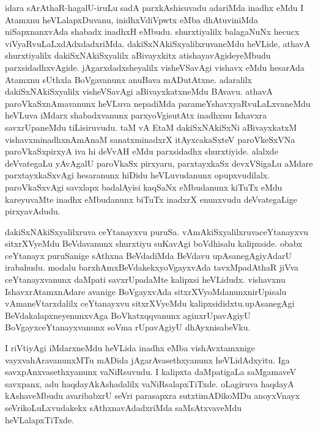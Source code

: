 \begin{artha}
idara sArAthaR-hagalU-iruLu sadA parxkAshisuvadu adariMda inadhx eMdu I Atamxnu heVLalapxDuvanu, inidhxVdiVpwtx eMba dhAtuviniMda niSapxnanxvAda shabadx inadhxH eMbudu. shurxtiyalilx balagaNuNx hecucx viVyaRvuLaLxdAdxdadxriMda. dakiSxNAkiSxyalilxruvaneMdu heVLide, athavA shurxtiyalilx dakiSxNAkiSxyalilx aBivayxkitx atishayavAgideyeMbudu parxsidadhxvAgide. jAgarxdadxsheyalilx visheVSavAgi vishavx eMdu hesarAda Atamxnu sUthxla BoVgavanunx anuBava mADutAtxne. adaralilx dakiSxNAkiSxyalilx visheVSavAgi aBivayxkatxneMdu BAvavu. athavA paroVkaSxnAmavanunx heVLuva nepadiMda parameYshavxyaRvuLaLxvaneMdu heVLuva iMdarx shabadxvanunx parxyoVgisutAtx inadhxnu Ishavxra savxrUpaneMdu tiLisiruvudu. taM vA EtaM dakiSxNAkiSxNi aBivayxkatxM vishavxminadhxnAmAnaM sanatxminadxrX itAyxcakaSxteV paroVkeSxVNa paroVkaSxpirxyA iva hi deVvAH eMdu parxsidadhx shurxtiyide. alalxde deVvategaLu yAvAgalU paroVkaSx pirxyaru, parxtayxkaSx devxVSigaLu aMdare parxtayxkaSxvAgi hesaranunx hiDidu heVLuvudanunx opupxvudilalx. paroVkaSxvAgi savxlapx badalAyisi kaqSaNx eMbudanunx kiTuTx eMdu kareyuvaMte inadhx eMbudanunx biTuTx inadxrX enunxvudu deVvategaLige pirxyavAdudu. 
\end{artha}


\begin{artha}
dakiSxNAkiSxyalilxruva ceYtanayxvu puruSa. vAmAkiSxyalilxruva\break ceYtanayxvu sitxrXVyeMdu BeVdavanunx shurxtiyu suKavAgi boVdhisalu kalipxside. obabx ceYtanayx puruSanige sAthxna BeVdadiMda BeVdavu upAsanegAgiyAdarU irabahudu. modalu barxhAmxBeVdakekxyoVgayxvAda tavxMpadAthaR jiVva ceYtanayxvanunx daMpati savxrUpadaMte kalipxsi heVLidudx. vishavxnu IshavxrAtamxnAdare avanige BoVgayxvAda sitxrXVyoMdanunx\break nirUpisalu vAmaneVtarxdalilx ceYtanayxvu sitxrXVyeMdu kalipxsididxtu.\break upAsanegAgi BeVdakalapxneyenunxvAga BoVkatxqqvanunx aginxrUpa\-\break vAgiyU BoVgayxceYtanayxvanunx soVma rUpavAgiyU dhAyxnisabeVku.
\end{artha}

\begin{artha}
I riVtiyAgi iMdarxneMdu heVLida inadhx eMba vishAvxtamxnige vayxvahAravanunxMTu mADida jAgarAvasethxyanunx heVLidAdxyitu. Iga savxpAnxvasethxyanunx vaNiRsuvudu. I kalipxta daMpatigaLa saMgamaveV savxpanx, adu haqdayAkAshadalilx vaNiRsalapxTiTxde. oLagiruva haqdayA kAshaveMbudu avaribabxrU seVri parasapxra sutxtimADikoMDu anoyxVnayx seVrikoLuLxvudakekx sAthxnavAdadxriMda saMsAtxvaveMdu heVLalapxTiTxde. 
\end{artha}

